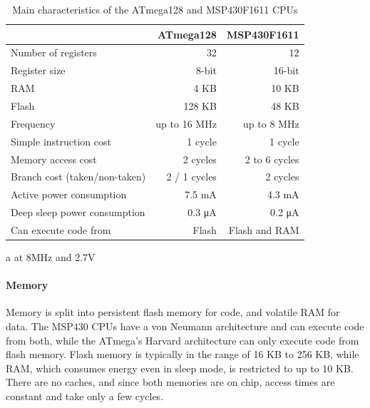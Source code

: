 \begin{table}
\caption{Main characteristics of the ATmega128 and MSP430F1611 CPUs}
\label{tbl-ATmega128-msp430f1611}
    \begin{threeparttable}
    \begin{tabular}{lrr} %
    \toprule
                                           & ATmega128 \cite{Atmel:ATmega128Datasheet, Atmel:AVRInstructionSetManual}   & MSP430F1611 \cite{TexasInstrumentsIncorporated:MSP430F1611Datasheet, TexasInstrumentsIncorporated:MSP430x1xxUsersGuide} \\
    \midrule
    \midrule
    Number of registers                    & 32           & 12            \\
    Register size                          & 8-bit        & 16-bit        \\
    RAM                                    & 4 KB         & 10 KB         \\
    Flash                                  & 128 KB       & 48 KB         \\
    Frequency                              & up to 16 MHz & up to 8 MHz   \\
    Simple instruction cost                & 1 cycle      & 1 cycle       \\
    Memory access cost                     & 2 cycles     & 2 to 6 cycles \\
    Branch cost (taken/non-taken)          & 2 / 1 cycles & 2 cycles      \\
    Active power consumption\tnote{a}      & 7.5 mA       & 4.3 mA        \\ %
    Deep sleep power consumption           & 0.3 μA       & 0.2 μA        \\
    Can execute code from                  & Flash        & Flash and RAM \\
    \bottomrule
    \end{tabular}
    \begin{tablenotes}
        \item[a] at 8MHz and 2.7V
    \end{tablenotes}
    \end{threeparttable}
\end{table}

\paragraph{Memory}
Memory is split into persistent flash memory for code, and volatile RAM for data. The MSP430 CPUs have a von Neumann architecture and can execute code from both, while the ATmega's Harvard architecture can only execute code from flash memory. Flash memory is typically in the range of 16 KB to 256 KB, while RAM, which consumes energy even in sleep mode, is restricted to up to 10 KB. There are no caches, and since both memories are on chip, access times are constant and take only a few cycles.

